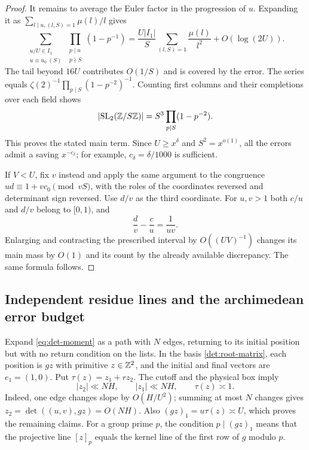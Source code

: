 \begin{proof}
It remains to average the Euler factor in the progression of
$u$.  Expanding it as
$\sum_{l\mid u,(l,S)=1}\mu(l)/l$ gives
\[
 \sum_{\substack{u/U\in I_1\\u\equiv u_0\ (S)}}
 \prod_{\substack{p\mid u\\p\nmid S}}(1-p^{-1})
 =\frac{U|I_1|}{S}
       \sum_{(l,S)=1}\frac{\mu(l)}{l^2}+O(\log(2U)).
\]
The tail beyond $16U$ contributes $O(1/S)$ and is covered by
the error.  The series equals
$\zeta(2)^{-1}\prod_{p\mid S}(1-p^{-2})^{-1}$.
Counting first columns and their completions over each field
shows
\begin{equation}\label{det:SL-order}
 |\mathrm{SL}_2(\mathbb Z/S\mathbb Z)|
       =S^3\prod_{p\mid S}(1-p^{-2}).
\end{equation}
This proves the stated main term.  Since $U\geq x^\delta$ and
$S^2=x^{o(1)}$, all the errors admit a saving $x^{-c_\delta}$;
for example, $c_\delta=\delta/1000$ is sufficient.

If $V<U$, fix $v$ instead and apply the same argument to the
congruence $ud\equiv1+vc_0\pmod{vS}$, with the roles of the
coordinates reversed and determinant sign reversed.  Use
$d/v$ as the third coordinate.  For $u,v>1$ both $c/u$ and
$d/v$ belong to $[0,1)$, and
\[
 \frac dv-\frac cu=\frac1{uv}.
\]
Enlarging and contracting the prescribed interval by
$O((UV)^{-1})$ changes its main mass by $O(1)$ and its count
by the already available discrepancy.  The same formula follows.
\end{proof}

\subsection{Independent residue lines and the archimedean error budget}

Expand \eqref{eq:det-moment} as a path with $N$ edges, returning
to its initial position but with no return condition on the
lists.  In the basis \eqref{det:root-matrix}, each position is
$gz$ with primitive $z\in\mathbb Z^2$, and the initial and final
vectors are $e_1=(1,0)$.  Put $\tau(z)=z_1+rz_2$.  The cutoff
and the physical box imply
\begin{equation}\label{det:tube}
 |z_2|\ll NH,\qquad |z_1|\ll NH,\qquad \tau(z)\asymp1.
\end{equation}
Indeed, one edge changes slope by $O(H/U^2)$; summing at most
$N$ changes gives $z_2=\det((u,v),gz)=O(NH)$.
Also $(gz)_1=u\tau(z)\asymp U$, which proves the remaining
claims.  For a group prime $p$, the condition $p\mid(gz)_1$
means that the projective line $[z]_p$ equals the kernel line
of the first row of $g$ modulo $p$.

